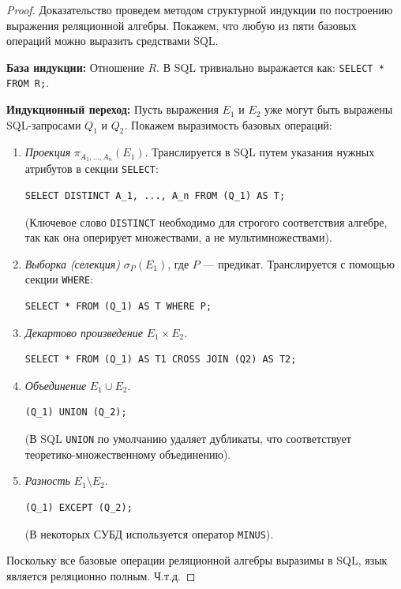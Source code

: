 \documentclass[12pt,a4paper]{article}
\begin{document}
\begin{proof}
Доказательство проведем методом структурной индукции по построению выражения реляционной алгебры. Покажем, что любую из пяти базовых операций можно выразить средствами SQL.

\textbf{База индукции:} Отношение $R$.
В SQL тривиально выражается как: \lstinline|SELECT * FROM R;|.

\textbf{Индукционный переход:} Пусть выражения $E_1$ и $E_2$ уже могут быть выражены SQL-запросами $Q_1$ и $Q_2$. Покажем выразимость базовых операций:
\begin{enumerate}
    \item \textit{Проекция} $\pi_{A_1, \dots, A_n}(E_1)$.
    Транслируется в SQL путем указания нужных атрибутов в секции \texttt{SELECT}:
    \begin{lstlisting}
SELECT DISTINCT A_1, ..., A_n FROM (Q_1) AS T;
    \end{lstlisting}
    (Ключевое слово \texttt{DISTINCT} необходимо для строгого соответствия алгебре, так как она оперирует множествами, а не мультимножествами).

    \item \textit{Выборка (селекция)} $\sigma_P(E_1)$, где $P$ --- предикат.
    Транслируется с помощью секции \texttt{WHERE}:
    \begin{lstlisting}
SELECT * FROM (Q_1) AS T WHERE P;
    \end{lstlisting}

    \item \textit{Декартово произведение} $E_1 \times E_2$.
    \begin{lstlisting}
SELECT * FROM (Q_1) AS T1 CROSS JOIN (Q2) AS T2;
    \end{lstlisting}

    \item \textit{Объединение} $E_1 \cup E_2$.
    \begin{lstlisting}
(Q_1) UNION (Q_2);
    \end{lstlisting}
    (В SQL \texttt{UNION} по умолчанию удаляет дубликаты, что соответствует теоретико-множественному объединению).

    \item \textit{Разность} $E_1 \setminus E_2$.
    \begin{lstlisting}
(Q_1) EXCEPT (Q_2);
    \end{lstlisting}
    (В некоторых СУБД используется оператор \texttt{MINUS}).
\end{enumerate}
Поскольку все базовые операции реляционной алгебры выразимы в SQL, язык является реляционно полным. Ч.т.д.
\end{proof}
\end{document}
